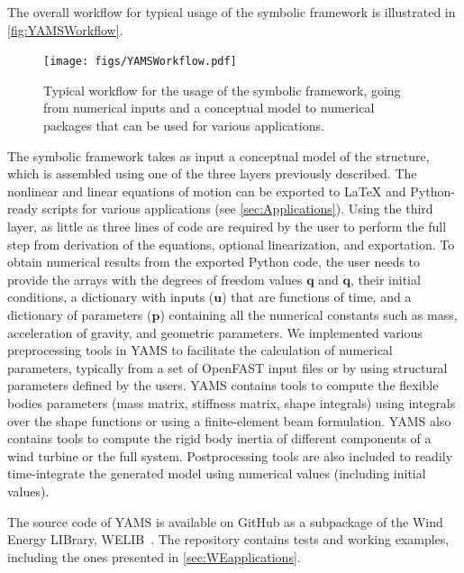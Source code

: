 \documentclass[wes, manuscript]{copernicus}
\renewcommand{\v}[1]{\boldsymbol{#1}}
\begin{document}
The overall workflow for typical usage of the symbolic framework is illustrated in \autoref{fig:YAMSWorkflow}.
\noindent\begin{figure}[!htb]\centering%
  \texttt{[image: figs/YAMSWorkflow.pdf]}
  \caption{Typical workflow for the usage of the symbolic framework, going from numerical inputs and a conceptual model to numerical packages that can be used for various applications.}\label{fig:YAMSWorkflow}%
\end{figure}
The symbolic framework takes as input a conceptual model of the structure, which is assembled using one of the three layers previously described. 
The nonlinear and linear equations of motion can be exported to LaTeX and Python-ready scripts for various applications (see \autoref{sec:Applications}).
Using the third layer, as little as three lines of code are required by the user to perform the full step from derivation of the equations, optional linearization, and exportation.
% 
To obtain numerical results from the exported Python code, the user needs to provide the arrays with the degrees of freedom values $\v{q}$ and $\v{\dot{q}}$, their initial conditions, a dictionary with inputs ($\v{u}$) that are functions of time, and a dictionary of parameters ($\v{p}$) containing all the numerical constants such as mass, acceleration of gravity, and geometric parameters.
We implemented various preprocessing tools in YAMS to facilitate the calculation of numerical parameters, typically from a set of OpenFAST input files or by using structural parameters defined by the users. YAMS contains tools to compute the flexible bodies parameters (mass matrix, stiffness matrix, shape integrals) using integrals over the shape functions or using a finite-element beam formulation.
YAMS also contains tools to compute the rigid body inertia of different components of a wind turbine or the full system. Postprocessing tools are also included to readily time-integrate the generated model using numerical values (including initial values).


The source code of YAMS is available on GitHub as a subpackage of the Wind Energy LIBrary, WELIB~\citep{WELIBgithub}.  
The repository contains tests and working examples, including the ones presented in \autoref{sec:WEapplications}.
\end{document}
